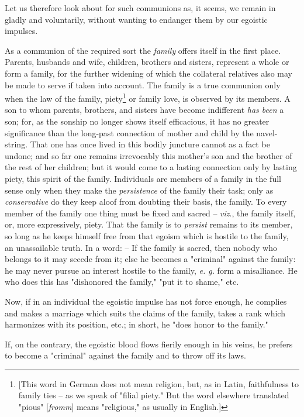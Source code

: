 Let us therefore look about for such communions as, it seems, we remain in 
gladly and voluntarily, without wanting to endanger them by our egoistic 
impulses.

As a communion of the required sort the \textit{family} offers itself in the 
first place. Parents, husbands and wife, children, brothers and sisters, 
represent a whole or form a family, for the further widening of which the 
collateral relatives also may be made to serve if taken into account. The 
family is a true communion only when the law of the family, 
piety\footnote{[This word in German does not mean religion, but, as in Latin, 
faithfulness to family ties -- as we speak of "{}filial piety."{} But the word 
elsewhere translated "{}pious"{} [\textit{fromm}] means "{}religious,"{} as 
usually in English.]} or family love, is observed by its members. A son to 
whom parents, brothers, and sisters have become indifferent \textit{has been} 
a son; for, as the sonship no longer shows itself efficacious, it has no 
greater significance than the long-past connection of mother and child by the 
navel-string. That one has once lived in this bodily juncture cannot as a fact 
be undone; and so far one remains irrevocably this mother's son and the 
brother of the rest of her children; but it would come to a lasting connection 
only by lasting piety, this spirit of the family. Individuals are members of a 
family in the full sense only when they make the \textit{persistence} of the 
family their task; only as \textit{conservative} do they keep aloof from 
doubting their basis, the family. To every member of the family one thing must 
be fixed and sacred -- \textit{viz}., the family itself, or, more 
expressively, piety. That the family is to \textit{persist} remains to its 
member, so long as he keeps himself free from that egoism which is hostile to 
the family, an unassailable truth. In a word: -- If the family is sacred, then 
nobody who belongs to it may secede from it; else he becomes a "{}criminal"{} 
against the family: he may never pursue an interest hostile to the family, 
\textit{e. g.} form a misalliance. He who does this has "{}dishonored the 
family,"{} "{}put it to shame,"{} etc.

Now, if in an individual the egoistic impulse has not force enough, he 
complies and makes a marriage which suits the claims of the family, takes a 
rank which harmonizes with its position, etc.; in short, he "{}does honor to 
the family."{}

If, on the contrary, the egoistic blood flows fierily enough in his veins, he 
prefers to become a "{}criminal"{} against the family and to throw off its 
laws.

